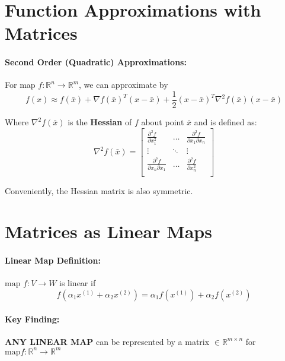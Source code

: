 \documentclass[a4paper,12pt]{report}
\def\reals{\mathbb{R}}
\begin{document}
\section{Function Approximations with Matrices}

\paragraph{Second Order (Quadratic) Approximations: } For map $f:\reals^n\to \reals^m$, we can approximate by
\begin{equation}
f(x)\approx f(\bar{x}) + \nabla f(\bar{x})^T (x-\bar{x}) + \frac{1}{2} (x-\bar{x})^T \nabla^2 f(\bar{x}) (x-\bar{x})
\end{equation}

Where $\nabla^2 f(\bar{x})$ is the \textbf{Hessian} of $f$ about point $\bar{x}$ and is defined as: 
\begin{equation}
\nabla^2 f(\bar{x}) = 
\begin{bmatrix}
\frac{\partial^2 f}{\partial x_1^2} & \dots & \frac{\partial^2 f}{\partial x_1\partial x_n} \\
\vdots & \ddots & \vdots \\
\frac{\partial^2 f}{\partial x_n\partial x_1} & \dots & \frac{\partial^2 f}{\partial x_n^2} \\
\end{bmatrix}
\end{equation}

Conveniently, the Hessian matrix is also symmetric. 

\section{Matrices as Linear Maps}

\paragraph{Linear Map Definition: } $\text{map } f:V\to W$ is linear if
\begin{equation}
	f(\alpha_1 x^{(1)} + \alpha_2 x^{(2)} ) = \alpha_1 f(x^{(1)}) + \alpha_2 f(x^{(2)})
\end{equation}

\paragraph{Key Finding: } \textbf{ANY LINEAR MAP} can be represented by a matrix $\in \reals^{m\times n}$ for $\text{map} f : \reals^n \to \reals^m$
\end{document}
